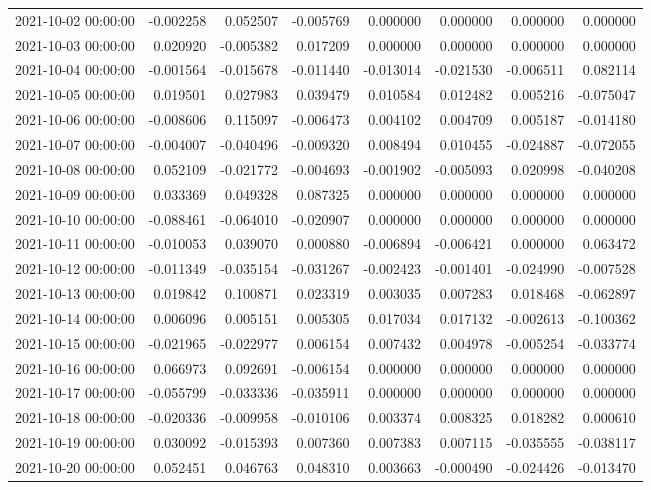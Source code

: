 \begin{tabular}{lrrrrrrr}
2021-10-02 00:00:00 & -0.002258 & 0.052507 & -0.005769 & 0.000000 & 0.000000 & 0.000000 & 0.000000 \\
2021-10-03 00:00:00 & 0.020920 & -0.005382 & 0.017209 & 0.000000 & 0.000000 & 0.000000 & 0.000000 \\
2021-10-04 00:00:00 & -0.001564 & -0.015678 & -0.011440 & -0.013014 & -0.021530 & -0.006511 & 0.082114 \\
2021-10-05 00:00:00 & 0.019501 & 0.027983 & 0.039479 & 0.010584 & 0.012482 & 0.005216 & -0.075047 \\
2021-10-06 00:00:00 & -0.008606 & 0.115097 & -0.006473 & 0.004102 & 0.004709 & 0.005187 & -0.014180 \\
2021-10-07 00:00:00 & -0.004007 & -0.040496 & -0.009320 & 0.008494 & 0.010455 & -0.024887 & -0.072055 \\
2021-10-08 00:00:00 & 0.052109 & -0.021772 & -0.004693 & -0.001902 & -0.005093 & 0.020998 & -0.040208 \\
2021-10-09 00:00:00 & 0.033369 & 0.049328 & 0.087325 & 0.000000 & 0.000000 & 0.000000 & 0.000000 \\
2021-10-10 00:00:00 & -0.088461 & -0.064010 & -0.020907 & 0.000000 & 0.000000 & 0.000000 & 0.000000 \\
2021-10-11 00:00:00 & -0.010053 & 0.039070 & 0.000880 & -0.006894 & -0.006421 & 0.000000 & 0.063472 \\
2021-10-12 00:00:00 & -0.011349 & -0.035154 & -0.031267 & -0.002423 & -0.001401 & -0.024990 & -0.007528 \\
2021-10-13 00:00:00 & 0.019842 & 0.100871 & 0.023319 & 0.003035 & 0.007283 & 0.018468 & -0.062897 \\
2021-10-14 00:00:00 & 0.006096 & 0.005151 & 0.005305 & 0.017034 & 0.017132 & -0.002613 & -0.100362 \\
2021-10-15 00:00:00 & -0.021965 & -0.022977 & 0.006154 & 0.007432 & 0.004978 & -0.005254 & -0.033774 \\
2021-10-16 00:00:00 & 0.066973 & 0.092691 & -0.006154 & 0.000000 & 0.000000 & 0.000000 & 0.000000 \\
2021-10-17 00:00:00 & -0.055799 & -0.033336 & -0.035911 & 0.000000 & 0.000000 & 0.000000 & 0.000000 \\
2021-10-18 00:00:00 & -0.020336 & -0.009958 & -0.010106 & 0.003374 & 0.008325 & 0.018282 & 0.000610 \\
2021-10-19 00:00:00 & 0.030092 & -0.015393 & 0.007360 & 0.007383 & 0.007115 & -0.035555 & -0.038117 \\
2021-10-20 00:00:00 & 0.052451 & 0.046763 & 0.048310 & 0.003663 & -0.000490 & -0.024426 & -0.013470 \\

\end{tabular}
